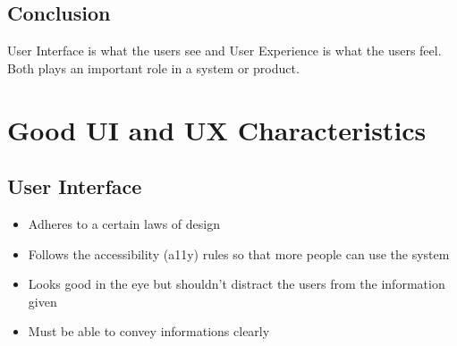 \documentclass[12pt,titlepage]{article}
\begin{document}
\subsection{Conclusion}
User Interface is what the users see and User Experience is what the users feel. Both plays an important role in a system or product.

\pagebreak

\section{Good UI and UX Characteristics}

\subsection{User Interface}
\begin{itemize}
    \item Adheres to a certain laws of design
    \item Follows the accessibility (a11y) rules so that more people can use the system
    \item Looks good in the eye but shouldn't distract the users from the information given
    \item Must be able to convey informations clearly
\end{itemize}
\end{document}
